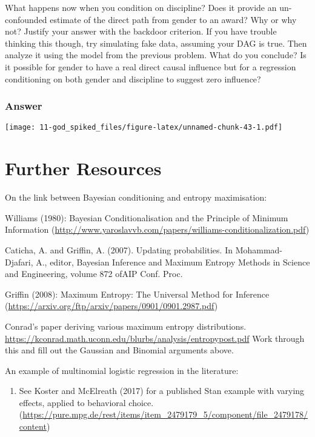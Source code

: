 \documentclass[
]{book}
\providecommand{\tightlist}{%
  \setlength{\itemsep}{0pt}\setlength{\parskip}{0pt}}
\begin{document}
What happens now when you condition on discipline? Does it provide an un-confounded estimate of the direct path from gender to an award? Why or why not? Justify your answer with the backdoor criterion. If you have trouble thinking this though, try simulating fake data, assuming your DAG is true. Then analyze it using the model from the previous problem. What do you conclude? Is it possible for gender to have a real direct causal influence but for a regression conditioning on both gender and discipline to suggest zero influence?

\hypertarget{answer-97}{%
\subsubsection*{Answer}\label{answer-97}}

\texttt{[image: 11-god\_spiked\_files/figure-latex/unnamed-chunk-43-1.pdf]}

\hypertarget{further-resources-1}{%
\section*{Further Resources}\label{further-resources-1}}

On the link between Bayesian conditioning and entropy maximisation:

Williams (1980): Bayesian Conditionalisation and the Principle of Minimum Information (\url{http://www.yaroslavvb.com/papers/williams-conditionalization.pdf})

Caticha, A. and Griffin, A. (2007). Updating probabilities. In Mohammad-Djafari, A., editor, Bayesian Inference and Maximum Entropy Methods in Science and Engineering, volume 872 ofAIP Conf. Proc.

Griffin (2008): Maximum Entropy: The Universal Method for Inference (\url{https://arxiv.org/ftp/arxiv/papers/0901/0901.2987.pdf})

Conrad's paper deriving various maximum entropy distributions. \url{https://kconrad.math.uconn.edu/blurbs/analysis/entropypost.pdf}
Work through this and fill out the Gaussian and Binomial arguments above.

An example of multinomial logistic regression in the literature:

\begin{enumerate}
\def\labelenumi{\arabic{enumi}.}
\setcounter{enumi}{178}
\tightlist
\item
  See Koster and McElreath (2017) for a published Stan example with varying effects, applied to behavioral choice.
  (\url{https://pure.mpg.de/rest/items/item_2479179_5/component/file_2479178/content})
\end{enumerate}
\end{document}

